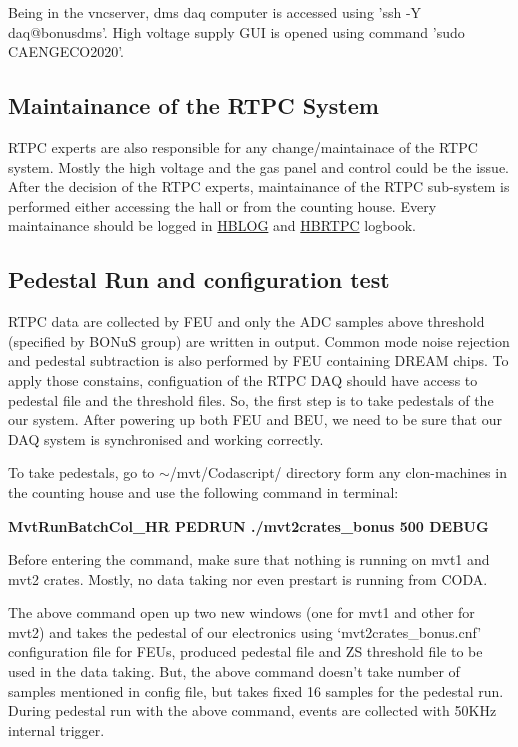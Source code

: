 Being in the vncserver, dms daq computer is accessed using 'ssh -Y daq@bonusdms'. High voltage supply GUI is opened using command 'sudo CAENGECO2020'.

\subsection{Maintainance of the RTPC System}
\label{sub-sec:maintainance}

RTPC experts are also responsible for any change/maintainace of the RTPC system. Mostly the high voltage and the gas panel and control could be the issue. After the decision of the RTPC experts, maintainance of the RTPC sub-system is performed either accessing the hall or from the counting house. Every maintainance should be logged in \href{https://logbooks.jlab.org/book/hblog}{HBLOG} and \href{https://logbooks.jlab.org/book/hbrtpc}{HBRTPC} logbook.

\subsection{Pedestal Run and configuration test}
\label{sub-sec:ped}

RTPC data are collected by FEU and only the ADC samples above threshold (specified by BONuS group) are written in output. Common mode noise rejection and pedestal subtraction is also performed by FEU containing DREAM chips. To apply those constains, configuation of the RTPC DAQ should have access to pedestal file and the threshold files. So, the first step is to take pedestals of the our system. After powering up both FEU and BEU, we need to be sure that our DAQ system is synchronised and working correctly.

To take pedestals, go to $\sim$/mvt/Codascript/ directory form any clon-machines in the counting house and use the following command in terminal:

\begin{center}
	\centering \textbf{MvtRunBatchCol\_HR PEDRUN ./mvt2crates\_bonus 500 DEBUG}
\end{center}

Before entering the command, make sure that nothing is running on mvt1 and mvt2 crates. Mostly, no data taking nor even prestart is running from CODA.

The above command open up two new windows (one for mvt1 and other for mvt2) and takes the pedestal of our electronics using `mvt2crates\_bonus.cnf' configuration file for FEUs, produced pedestal file and ZS threshold file to be used in the data taking. But, the above command doesn't take number of samples mentioned in config file, but takes fixed 16 samples for the pedestal run. During pedestal run with the above command, events are collected with 50KHz internal trigger.

